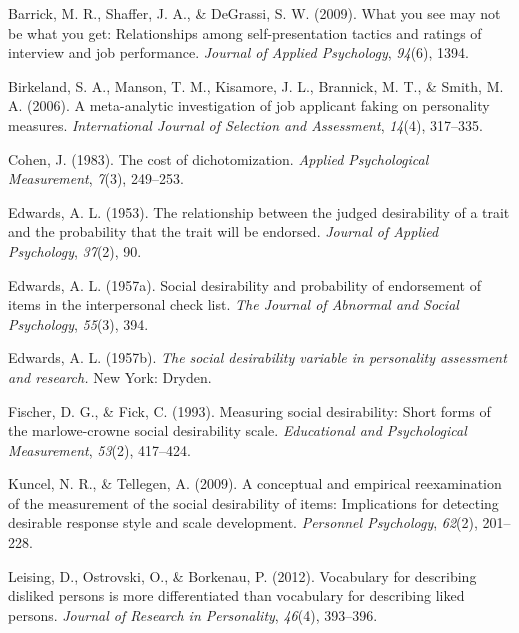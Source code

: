 \documentclass[
  english,
  ,jou]{apa6}
\begin{document}
\hypertarget{refs}{}
\leavevmode\hypertarget{ref-barrick_what_2009}{}%
Barrick, M. R., Shaffer, J. A., \& DeGrassi, S. W. (2009). What you see may not be what you get: Relationships among self-presentation tactics and ratings of interview and job performance. \emph{Journal of Applied Psychology}, \emph{94}(6), 1394.

\leavevmode\hypertarget{ref-birkeland_meta-analytic_2006}{}%
Birkeland, S. A., Manson, T. M., Kisamore, J. L., Brannick, M. T., \& Smith, M. A. (2006). A meta-analytic investigation of job applicant faking on personality measures. \emph{International Journal of Selection and Assessment}, \emph{14}(4), 317--335.

\leavevmode\hypertarget{ref-cohen_cost_1983}{}%
Cohen, J. (1983). The cost of dichotomization. \emph{Applied Psychological Measurement}, \emph{7}(3), 249--253.

\leavevmode\hypertarget{ref-edwards_relationship_1953}{}%
Edwards, A. L. (1953). The relationship between the judged desirability of a trait and the probability that the trait will be endorsed. \emph{Journal of Applied Psychology}, \emph{37}(2), 90.

\leavevmode\hypertarget{ref-edwards_social_1957}{}%
Edwards, A. L. (1957a). Social desirability and probability of endorsement of items in the interpersonal check list. \emph{The Journal of Abnormal and Social Psychology}, \emph{55}(3), 394.

\leavevmode\hypertarget{ref-edwards_social_1957a}{}%
Edwards, A. L. (1957b). \emph{The social desirability variable in personality assessment and research.} New York: Dryden.

\leavevmode\hypertarget{ref-fischer_measuring_1993}{}%
Fischer, D. G., \& Fick, C. (1993). Measuring social desirability: Short forms of the marlowe-crowne social desirability scale. \emph{Educational and Psychological Measurement}, \emph{53}(2), 417--424.

\leavevmode\hypertarget{ref-kuncel_conceptual_2009}{}%
Kuncel, N. R., \& Tellegen, A. (2009). A conceptual and empirical reexamination of the measurement of the social desirability of items: Implications for detecting desirable response style and scale development. \emph{Personnel Psychology}, \emph{62}(2), 201--228.

\leavevmode\hypertarget{ref-leising_vocabulary_2012}{}%
Leising, D., Ostrovski, O., \& Borkenau, P. (2012). Vocabulary for describing disliked persons is more differentiated than vocabulary for describing liked persons. \emph{Journal of Research in Personality}, \emph{46}(4), 393--396.
\end{document}
